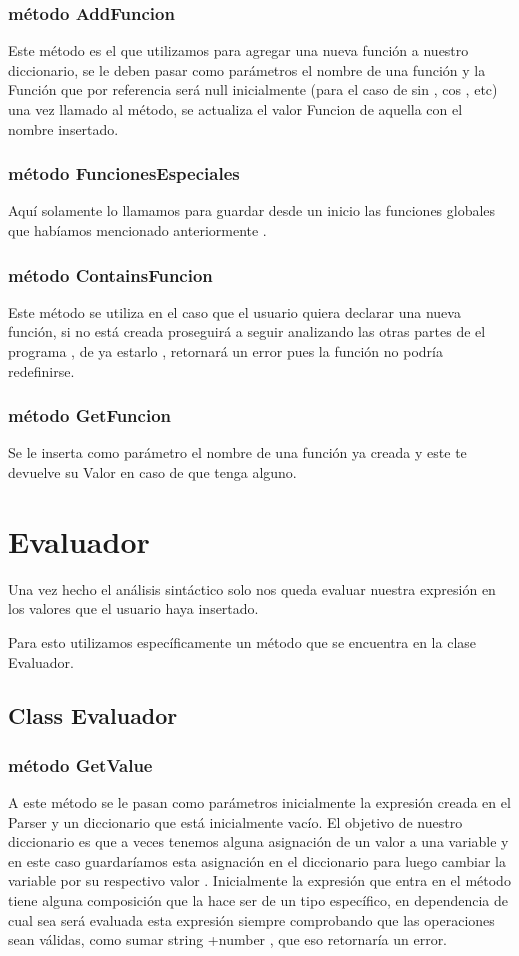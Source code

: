 \documentclass[a4paper,12pt]{article}
\begin{document}
\subsubsection[short]{método AddFuncion}
Este método es el que utilizamos para agregar una nueva función a nuestro diccionario,  se le deben pasar como parámetros el nombre de una función y la Función que por referencia será null inicialmente (para el caso de sin , cos , etc) una vez llamado al
 método,  se actualiza el valor Funcion de aquella con el nombre insertado.

\subsubsection[short]{método FuncionesEspeciales}
Aquí solamente lo llamamos para guardar desde un inicio las funciones globales que 
habíamos mencionado anteriormente .

\subsubsection[short]{método ContainsFuncion}
Este método se utiliza en el caso que el usuario quiera declarar una nueva función,  si no está 
creada proseguirá a seguir analizando las otras partes de el programa , de ya estarlo , retornará un error pues la función no podría redefinirse.

\subsubsection[short]{método GetFuncion}
Se le inserta como parámetro el nombre de una función ya creada y este te devuelve su 
Valor en caso de que tenga alguno.

\section{Evaluador}
Una vez hecho el análisis sintáctico solo nos queda evaluar nuestra expresión en los valores que el usuario haya insertado.

Para esto utilizamos específicamente un método que se encuentra en la clase Evaluador.

\subsection[short]{Class Evaluador}
\subsubsection[short]{método GetValue}
A este método se le pasan como parámetros inicialmente la expresión creada en el Parser y un diccionario que está inicialmente vacío. 
 El objetivo de nuestro diccionario es que a veces tenemos alguna asignación de un valor a una variable y en este caso guardaríamos esta asignación 
 en el diccionario para luego cambiar la variable por su respectivo valor . Inicialmente la expresión que entra en el método tiene alguna composición 
 que la hace ser de un tipo específico,  en dependencia de cual sea será evaluada esta expresión siempre comprobando que las operaciones sean válidas,  como sumar  string +number , que eso retornaría un error.
 
\end{document}
